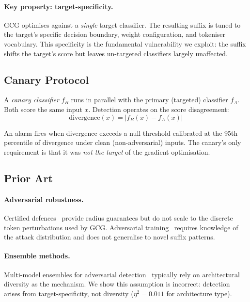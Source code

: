 \documentclass{article}
\begin{document}
\paragraph{Key property: target-specificity.} GCG optimises against a \emph{single} target classifier. The resulting suffix is tuned to the target's specific decision boundary, weight configuration, and tokeniser vocabulary. This specificity is the fundamental vulnerability we exploit: the suffix shifts the target's score but leaves un-targeted classifiers largely unaffected.

\subsection{Canary Protocol}

A \emph{canary classifier} $f_B$ runs in parallel with the primary (targeted) classifier $f_A$. Both score the same input $x$. Detection operates on the score disagreement:
\begin{equation}
\text{divergence}(x) = |f_B(x) - f_A(x)|
\end{equation}

An alarm fires when divergence exceeds a null threshold calibrated at the 95th percentile of divergence under clean (non-adversarial) inputs. The canary's only requirement is that it was \emph{not the target} of the gradient optimisation.

\subsection{Prior Art}

\paragraph{Adversarial robustness.} Certified defences~\citep{cohen2019certified} provide radius guarantees but do not scale to the discrete token perturbations used by GCG. Adversarial training~\citep{madry2018towards} requires knowledge of the attack distribution and does not generalise to novel suffix patterns.

\paragraph{Ensemble methods.} Multi-model ensembles for adversarial detection~\citep{tramer2020adaptive} typically rely on architectural diversity as the mechanism. We show this assumption is incorrect: detection arises from target-specificity, not diversity ($\eta^2 = 0.011$ for architecture type).
\end{document}
